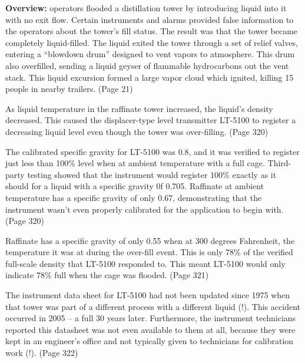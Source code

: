 












{\bf Overview:} operators flooded a distillation tower by introducing liquid into it with no exit flow.  Certain instruments and alarms provided false information to the operators about the tower's fill status.  The result was that the tower became completely liquid-filled.  The liquid exited the tower through a set of relief valves, entering a ``blowdown drum'' designed to vent vapors to atmosphere.  This drum also overfilled, sending a liquid geyser of flammable hydrocarbons out the vent stack.  This liquid excursion formed a large vapor cloud which ignited, killing 15 people in nearby trailers.  (Page 21)

\vskip 10pt

As liquid temperature in the raffinate tower increased, the liquid's density decreased.  This caused the displacer-type level transmitter LT-5100 to register a decreasing liquid level even though the tower was over-filling.  (Page 320)

\vskip 10pt

The calibrated specific gravity for LT-5100 was 0.8, and it was verified to register just less than 100\% level when at ambient temperature with a full cage.  Third-party testing showed that the instrument would register 100\% exactly as it should for a liquid with a specific gravity 0f 0.705.  Raffinate at ambient temperature has a specific gravity of only 0.67, demonstrating that the instrument wasn't even properly calibrated for the application to begin with.  (Page 320)

\vskip 10pt

Raffinate has a specific gravity of only 0.55 when at 300 degrees Fahrenheit, the temperature it was at during the over-fill event.  This is only 78\% of the verified full-scale density that LT-5100 responded to.  This meant LT-5100 would only indicate 78\% full when the cage was flooded.  (Page 321)

\vskip 10pt

The instrument data sheet for LT-5100 had not been updated since 1975 when that tower was part of a different process with a different liquid (!).  This accident occurred in 2005 -- a full 30 years later.  Furthermore, the instrument technicians reported this datasheet was not even available to them at all, because they were kept in an engineer's office and not typically given to technicians for calibration work (!).  (Page 322)

